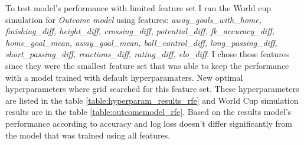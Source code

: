 To test model's performance with limited feature set I ran the World cup simulation for \textit{Outcome model} using features: \textit{away\_goals\_with\_home, finishing\_diff, height\_diff, crossing\_diff, potential\_diff, fk\_accuracy\_diff, home\_goal\_mean, away\_goal\_mean, ball\_control\_diff, long\_passing\_diff,  short\_passing\_diff, reactions\_diff, rating\_diff, elo\_diff}. I chose these features since they were the smallest feature set that was able to keep the performance with a model trained with default hyperparamaters. New optimal hyperparameters where grid searched for this feature set. These hyperparameters are listed in the table \ref{table:hyperparam_results_rfe} and World Cup simulation results are in the table \ref{table:outcomemodel_rfe}. Based on the results model's performance according to accuracy and log loss doesn't differ significantly from the model that was trained using all features.

